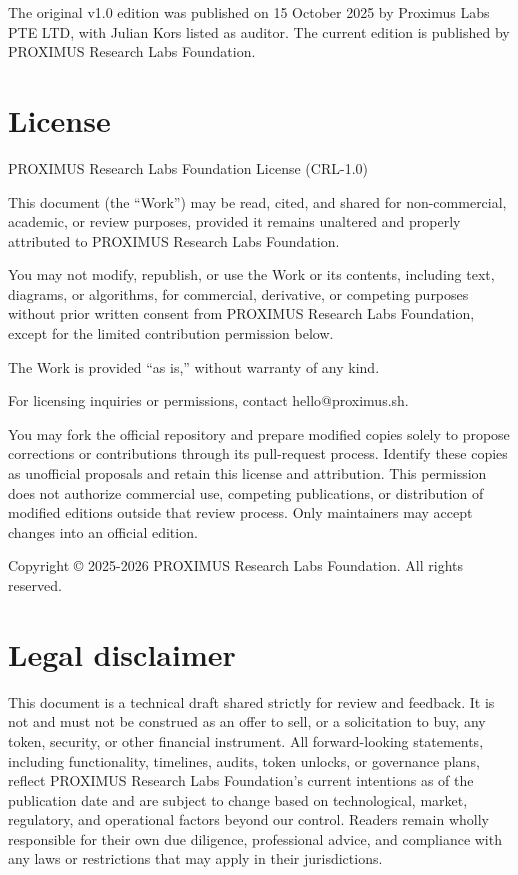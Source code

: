 \documentclass[10pt,a4paper]{article}
\begin{document}
The original v1.0 edition was published on 15 October 2025 by Proximus Labs PTE LTD, with Julian Kors listed as auditor. The current edition is published by PROXIMUS Research Labs Foundation.


\section*{License}
PROXIMUS Research Labs Foundation License (CRL-1.0)


This document (the ``Work'') may be read, cited, and shared for non-commercial, academic, or review purposes, provided it remains unaltered and properly attributed to PROXIMUS Research Labs Foundation.


You may not modify, republish, or use the Work or its contents, including text, diagrams, or algorithms, for commercial, derivative, or competing purposes without prior written consent from PROXIMUS Research Labs Foundation, except for the limited contribution permission below.


The Work is provided ``as is,'' without warranty of any kind.


For licensing inquiries or permissions, contact hello@proximus.sh.


You may fork the official repository and prepare modified copies solely to propose corrections or contributions through its pull-request process. Identify these copies as unofficial proposals and retain this license and attribution. This permission does not authorize commercial use, competing publications, or distribution of modified editions outside that review process. Only maintainers may accept changes into an official edition.


Copyright \copyright{} 2025-2026 PROXIMUS Research Labs Foundation. All rights reserved.


\section*{Legal disclaimer}
This document is a technical draft shared strictly for review and feedback. It is not and must not be construed as an offer to sell, or a solicitation to buy, any token, security, or other financial instrument. All forward-looking statements, including functionality, timelines, audits, token unlocks, or governance plans, reflect PROXIMUS Research Labs Foundation's current intentions as of the publication date and are subject to change based on technological, market, regulatory, and operational factors beyond our control. Readers remain wholly responsible for their own due diligence, professional advice, and compliance with any laws or restrictions that may apply in their jurisdictions.
\end{document}
